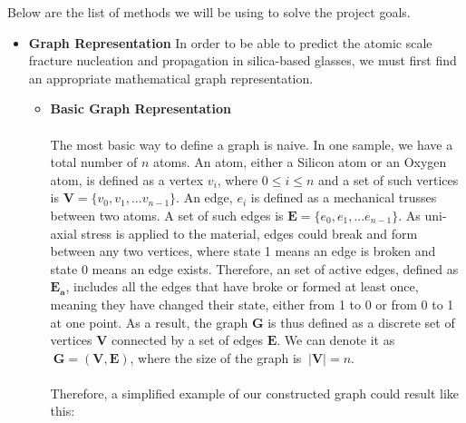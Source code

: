 Below are the list of methods we will be using to solve the project goals.

\begin{itemize}

\item \textbf{Graph Representation}
\bigskip
In order to be able to predict the atomic scale fracture nucleation and propagation in silica-based glasses, we must first find an appropriate mathematical graph representation. 
\begin{itemize}
    \item \textbf{Basic Graph Representation}
    \\
    \\
    The most basic way to define a graph is naive. In one sample, we have a total number of $n$ atoms. An atom, either a Silicon atom or an Oxygen atom, is defined as a vertex $v_i$, where $0 \leq i \leq n$ and a set of such vertices is $\mathbf{V} = \{v_0,v_1,...v_{n-1}\}$. An edge, $e_i$ is defined as a mechanical trusses between two atoms. A set of such edges is $\mathbf{E} = \{e_0,e_1,...e_{n-1}\}$. As uni-axial stress is applied to the material, edges could break and form between any two vertices, where state 1 means an edge is broken and state 0 means an edge exists. Therefore, an set of active edges, defined as $\mathbf{E_a}$, includes all the edges that have broke or formed at least once, meaning they have changed their state, either from 1 to 0 or from 0 to 1 at one point. As a result, the graph $\mathbf{G}$ is thus defined as a discrete set of vertices $\mathbf{V}$ connected by a set of edges $\mathbf{E}$. We can denote it as $\ \mathbf{G} = (\mathbf{V},\mathbf{E})$, where the size of the graph is $\ |\mathbf{V}| = n $.
    \\
    \\
    Therefore, a simplified example of our constructed graph could result like this:
    \bigskip
    \\
    \bigskip
    \\






\end{itemize}
\end{itemize}
